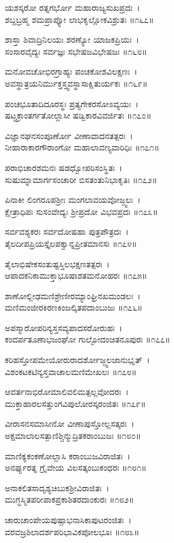 ಯಶಸ್ಕರೋ ರತ್ನಗರ್ಭೋ ಮಹಾರಾಜ್ಯಸುಖಪ್ರದಃ~।\\
ಶಬ್ದಬ್ರಹ್ಮ ಶಮಪ್ರಾಪ್ಯೋ ಲಾಭಕೃಲ್ಲೋಕವಿಶ್ರುತಃ ॥೧೬೭॥

	ಶಾಸ್ತಾ ಶಿವಾದ್ರಿನಿಲಯಃ ಶರಣ್ಯೋ ಯಾಜಕಪ್ರಿಯಃ~।\\
	ಸಂಸಾರವೈದ್ಯಃ ಸರ್ವಜ್ಞಃ ಸಭೇಷಜವಿಭೇಷಜಃ ॥೧೬೮॥

ಮನೋವಚೋಭಿರಗ್ರಾಹ್ಯಃ ಪಂಚಕೋಶವಿಲಕ್ಷಣಃ~।\\
ಅವಸ್ಥಾತ್ರಯನಿರ್ಮುಕ್ತಸ್ತ್ವವಸ್ಥಾಸಾಕ್ಷಿತುರ್ಯಕಃ ॥೧೬೯॥

	ಪಂಚಭೂತಾದಿದೂರಸ್ಥಃ ಪ್ರತ್ಯಗೇಕರಸೋಽವ್ಯಯಃ~।\\
	ಷಟ್ಚಕ್ರಾಂತರ್ಗತೋಲ್ಲಾಸೀ ಷಡ್ವಿಕಾರವಿವರ್ಜಿತಃ ॥೧೭೦॥

ವಿಜ್ಞಾನಘನಸಂಪೂರ್ಣೋ ವೀಣಾವಾದನತತ್ಪರಃ~।\\
ನೀಹಾರಾಕಾರಗೌರಾಂಗೋ ಮಹಾಲಾವಣ್ಯವಾರಿಧಿಃ ॥೧೭೧॥

	ಪರಾಭಿಚಾರಶಮನಃ ಷಡಧ್ವೋಪರಿಸಂಸ್ಥಿತಃ~।\\
	ಸುಷುಮ್ನಾಮಾರ್ಗಸಂಚಾರೀ ಬಿಸತಂತುನಿಭಾಕೃತಿಃ ॥೧೭೨॥

ಪಿನಾಕೀ ಲಿಂಗರೂಪಶ್ರೀಃ ಮಂಗಲಾವಯವೋಜ್ಜ್ವಲಃ~।\\
ಕ್ಷೇತ್ರಾಧಿಪಃ ಸುಸಂವೇದ್ಯಃ ಶ್ರೀಪ್ರದೋ ವಿಭವಪ್ರದಃ ॥೧೭೩॥

	ಸರ್ವವಶ್ಯಕರಃ ಸರ್ವದೋಷಹಾ ಪುತ್ರಪೌತ್ರದಃ~।\\
	ತೈಲದೀಪಪ್ರಿಯಸ್ತೈಲಪಕ್ವಾನ್ನಪ್ರೀತಮಾನಸಃ ॥೧೭೪॥

ತೈಲಾಭಿಷೇಕಸಂತುಷ್ಟಸ್ತಿಲಭಕ್ಷಣತತ್ಪರಃ~।\\
ಆಪಾದಕನಿಕಾಮುಕ್ತಾಭೂಷಾಶತಮನೋಹರಃ ॥೧೭೫॥

	ಶಾಣೋಲ್ಲೀಢಮಣಿಶ್ರೇಣೀರಮ್ಯಾಂಘ್ರಿನಖಮಂಡಲಃ~।\\
	ಮಣಿಮಂಜೀರಕಿರಣಕಿಂಜಲ್ಕಿತಪದಾಂಬುಜಃ ॥೧೭೬॥

ಅಪಸ್ಮಾರೋಪರಿನ್ಯಸ್ತಸವ್ಯಪಾದಸರೋರುಹಃ~।\\
ಕಂದರ್ಪತೂಣಾಭಜಂಘೋ ಗುಲ್ಫೋದಂಚಿತನೂಪುರಃ ॥೧೭೭॥

	ಕರಿಹಸ್ತೋಪಮೇಯೋರುರಾದರ್ಶೋಜ್ಜ್ವಲಜಾನುಭೃತ್~।\\
	ವಿಶಂಕಟಕಟಿನ್ಯಸ್ತವಾಚಾಲಮಣಿಮೇಖಲಃ ॥೧೭೮॥

ಆವರ್ತನಾಭಿರೋಮಾಲಿವಲಿಮತ್ಪಲ್ಲವೋದರಃ~।\\
ಮುಕ್ತಾಹಾರಲಸತ್ತುಂಗವಿಪುಲೋರಸ್ಕರಂಜಿತಃ ॥೧೭೯॥

	ವೀರಾಸನಸಮಾಸೀನೋ ವೀಣಾಪುಸ್ತೋಲ್ಲಸತ್ಕರಃ~।\\
	ಅಕ್ಷಮಾಲಾಲಸತ್ಪಾಣಿಶ್ಚಿನ್ಮುದ್ರಿತಕರಾಂಬುಜಃ ॥೧೮೦॥

ಮಾಣಿಕ್ಯಕಂಕಣೋಲ್ಲಾಸಿ ಕರಾಂಬುಜವಿರಾಜಿತಃ~।\\
ಅನರ್ಘ್ಯರತ್ನ ಗ್ರೈವೇಯ ವಿಲಸತ್ಕಂಬುಕಂಧರಃ ॥೧೮೧॥

	ಅನಾಕಲಿತಸಾದೃಶ್ಯಚಿಬುಕಶ್ರೀವಿರಾಜಿತಃ~।\\
	ಮುಗ್ಧಸ್ಮಿತಪರೀಪಾಕಪ್ರಕಾಶಿತರದಾಂಕುರಃ ॥೧೮೨॥

ಚಾರುಚಾಂಪೇಯಪುಷ್ಪಾಭನಾಸಿಕಾಪುಟರಂಜಿತಃ~।\\
ವರವಜ್ರಶಿಲಾದರ್ಶಪರಿಭಾವಿಕಪೋಲಭೂಃ ॥೧೮೩॥


